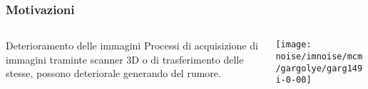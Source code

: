 \begin{frame}
  \frametitle{Motivazioni}
  \begin{columns}[t]
    \begin{column}{4cm}
       \begin{block}{Deterioramento delle immagini}
         Processi di acquisizione di immagini traminte scanner 3D o di
         trasferimento delle stesse, possono deteriorale generando del
         \alert{rumore}. 
       \end{block}
     \end{column}
     \begin{column}[T]{6cm}
      \texttt{[image: noise/imnoise/mcm/gargolye/garg149i-0-00]}
     \end{column}
  \end{columns}
\end{frame}
